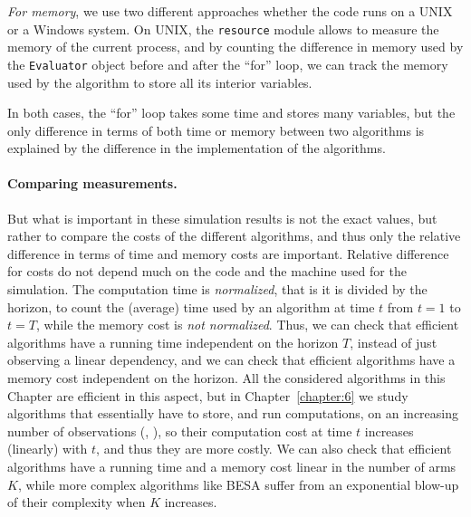     \emph{For memory}, we use two different approaches whether the code runs on a UNIX or a Windows system.
    On UNIX, the \texttt{resource} module allows to measure the memory of the current process, and by counting the difference in memory used by the \texttt{Evaluator} object before and after the ``for'' loop, we can track the memory used by the algorithm to store all its interior variables.

In both cases, the ``for'' loop takes some time and stores many variables, but the only difference in terms of both time or memory between two algorithms is explained by the difference in the implementation of the algorithms.



\paragraph{Comparing measurements.}
%
But what is important in these simulation results is not the exact values, but rather to compare the costs of the different algorithms, and thus only the relative difference in terms of time and memory costs are important.
Relative difference for costs do not depend much on the code and the machine used for the simulation.
%
The computation time is \emph{normalized}, that is it is divided by the horizon, to count the (average) time used by an algorithm at time $t$ from $t=1$ to $t=T$, while the memory cost is \emph{not normalized}.
%
Thus, we can check that efficient algorithms have a running time independent on the horizon $T$, instead of just observing a linear dependency, and we can check that efficient algorithms have a memory cost independent on the horizon.
All the considered algorithms in this Chapter are efficient in this aspect, but in Chapter~\ref{chapter:6} we study algorithms that essentially have to store, and run computations, on an increasing number of observations (\eg, \CUSUMUCB), so their computation cost at time $t$ increases (linearly) with $t$, and thus they are more costly.
%
We can also check that efficient algorithms have a running time and a memory cost linear in the number of arms $K$, while more complex algorithms like BESA suffer from an exponential blow-up of their complexity when $K$ increases.


